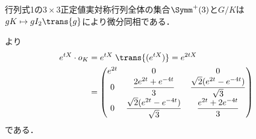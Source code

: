 \begin{npfwn}
  行列式1の$3\times 3$正定値実対称行列全体の集合$\Symm^{+}(3)$と$G/K$は$gK \mapsto gI_2\trans{g} $により微分同相である．
  
  より
  \begin{align}
    e^{tX}\cdot o_K &= e^{tX}\; \trans{(e^{tX})} = e^{2tX}\notag\\
                    &= \begin{pmatrix}
                      e^{2t} & 0 & 0 \\
                      0 & \dfrac{2e^{2t} + e^{-4t}}{3} &  \dfrac{\sqrt{2} (e^{2t} - e^{-4t})}{\sqrt{3}}\\
                      0 & \dfrac{\sqrt{2} (e^{2t} - e^{-4t})}{\sqrt{3}} & \dfrac{e^{2t} + 2e^{-4t}}{3}
                    \end{pmatrix}\label{eq:0114-1}
  \end{align}
  である．


\end{npfwn}
